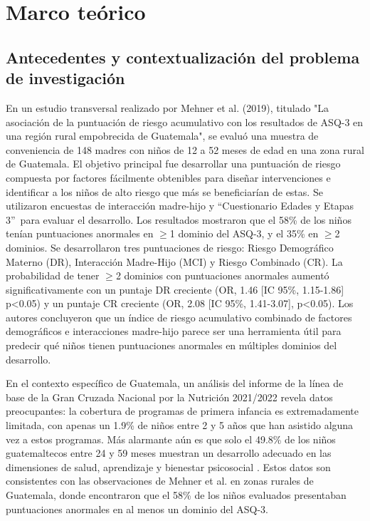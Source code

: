 \documentclass[11pt,letterpaper]{report}
\newcommand{\asq}{“Cuestionario Edades y Etapas 3”}
\begin{document}
	\chapter{Marco teórico}
\section{Antecedentes y contextualización del problema de investigación}
En un estudio transversal realizado por Mehner et al. (2019), titulado "La
asociación de la puntuación de riesgo acumulativo con los resultados de ASQ-3
en una región rural empobrecida de Guatemala", se evaluó una muestra de
conveniencia de 148 madres con niños de 12 a 52 meses de edad en una zona
rural de Guatemala. El objetivo principal fue desarrollar una puntuación de
riesgo compuesta por factores fácilmente obtenibles para diseñar intervenciones
e identificar a los niños de alto riesgo que más se beneficiarían de estas.
Se utilizaron encuestas de interacción madre-hijo y \asq\ para evaluar el
desarrollo. Los resultados mostraron que el 58\% de los niños tenían
puntuaciones anormales en $\ge$1 dominio del ASQ-3, y el 35\% en $\ge$2
dominios. Se desarrollaron tres puntuaciones de riesgo: Riesgo Demográfico
Materno (DR), Interacción Madre-Hijo (MCI) y Riesgo Combinado (CR). La
probabilidad de tener $\ge$2 dominios con puntuaciones anormales aumentó
significativamente con un puntaje DR creciente (OR, 1.46 [IC 95\%, 1.15-1.86]
p<0.05) y un puntaje CR creciente (OR, 2.08 [IC 95\%, 1.41-3.07], p<0.05). Los
autores concluyeron que un índice de riesgo acumulativo combinado de factores
demográficos e interacciones madre-hijo parece ser una herramienta útil para
predecir qué niños tienen puntuaciones anormales en múltiples dominios del
desarrollo. \cite{CMehner2019}

En el contexto específico de Guatemala, un análisis del informe de la  línea de
base de la Gran Cruzada Nacional por la Nutrición 2021/2022 revela  datos
preocupantes: la cobertura de programas de primera infancia es extremadamente
limitada, con apenas un 1.9\% de niños entre 2 y 5 años que han asistido alguna
vez a estos programas. Más alarmante aún es que solo el 49.8\% de los niños
guatemaltecos entre 24 y 59 meses muestran un desarrollo adecuado  en las
dimensiones de salud, aprendizaje y bienestar psicosocial \cite{SESAN2022}.
Estos datos son consistentes con las observaciones de Mehner et al.
\cite{CMehner2019} en zonas rurales de Guatemala, donde encontraron que el 58\%
de los niños evaluados presentaban puntuaciones anormales en al menos un
dominio del ASQ-3.
\end{document}
